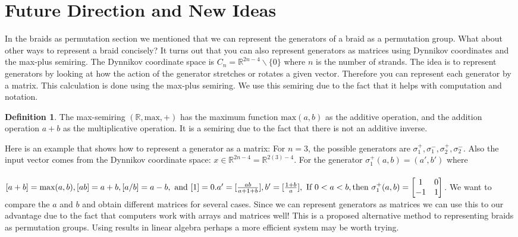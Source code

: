 \documentclass{article}
\theoremstyle{definition}
\newtheorem{definition}{Definition}[section]
\begin{document}
\section{Future Direction and New Ideas}
In the braids as permutation section we mentioned that we can represent the generators of a braid as a permutation group. What about other ways to represent a braid concisely? It turns out that you can also represent generators as matrices using Dynnikov coordinates and the max-plus semiring. The Dynnikov coordinate space is $C_n=\mathbb{R}^{2n-4} \backslash \{0\}$ where $n$ is the number of strands. The idea is to represent generators by looking at how the action of the generator stretches or rotates a given vector. Therefore you can represent each generator by a matrix. This calculation is done using the max-plus semiring. We use this semiring due to the fact that it helps with computation and notation. 

\begin{definition}
The max-semiring $(\mathbb{R},\text{max},+)$ has the maximum function $\text{max}(a,b)$ as the additive operation, and the addition operation $a+b$ as the multiplicative operation. It is a semiring due to the fact that there is not an additive inverse.
\end{definition}

\noindent Here is an example that shows how to represent a generator as a matrix: For $n=3$, the possible generators are $\sigma_1^+, \sigma_1^-, \sigma_2^+, \sigma_2^-$. Also the input vector comes from the Dynnikov coordinate space: $x \in \mathbb{R}^{2n-4} = \mathbb{R}^{2(3)-4}$. For the generator $\sigma_1^+ (a,b)=(a',b')$ where 
\\ \\
$[a+b]=\text{max}(a,b), [ab]=a+b, [a/b]=a-b, \text{ and } [1]=0. \\ \\ a'=[\frac{ab}{a+1+b}], b'=[\frac{1+b}{a}],   \\ \text{ If } 0<a<b , \text{then } \sigma_1^+ (a,b)=
\begin{bmatrix}
1 & 0\\
-1 & 1
\end{bmatrix} $. We want to compare the $a$ and $b$ and obtain different matrices for several cases. Since we can represent generators as matrices we can use this to our advantage due to the fact that computers work with arrays and matrices well! This is a proposed alternative method to representing braids as permutation groups. Using results in linear algebra perhaps a more efficient system may be worth trying. 
\end{document}
